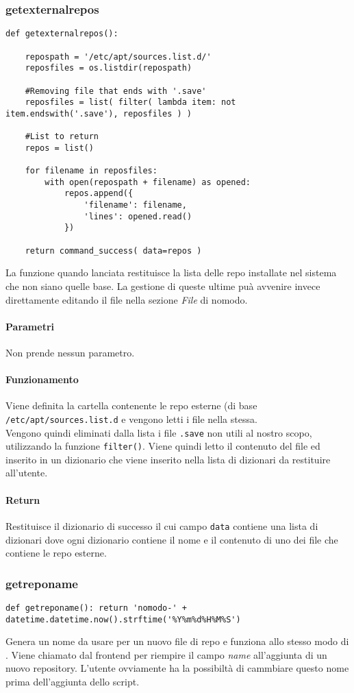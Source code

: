 \documentclass[11pt]{article}
\begin{document}
\subsubsection{getexternalrepos}\label{getexternalrepos}
\begin{lstlisting}
def getexternalrepos():

    repospath = '/etc/apt/sources.list.d/'
    reposfiles = os.listdir(repospath)

    #Removing file that ends with '.save'
    reposfiles = list( filter( lambda item: not item.endswith('.save'), reposfiles ) )

    #List to return
    repos = list()

    for filename in reposfiles:
        with open(repospath + filename) as opened:
            repos.append({
                'filename': filename,
                'lines': opened.read()
            })

    return command_success( data=repos )
\end{lstlisting}
La funzione quando lanciata restituisce la lista delle repo installate nel sistema che non siano quelle base. La gestione
di queste ultime puà avvenire invece direttamente editando il file nella sezione \textit{File} di nomodo.
\paragraph{Parametri}
Non prende nessun parametro.
\paragraph{Funzionamento}
Viene definita la cartella contenente le repo esterne (di base \texttt{/etc/apt/sources.list.d} e vengono letti i file
nella stessa.\\
Vengono quindi eliminati dalla lista i file \texttt{.save} non utili al nostro scopo, utilizzando la funzione \texttt{filter()}.
Viene quindi letto il contenuto del file ed inserito in un dizionario che viene inserito nella lista di dizionari da restituire
all'utente.
\paragraph{Return}
Restituisce il dizionario di successo il cui campo \texttt{data} contiene una lista di dizionari dove ogni dizionario contiene
il nome e il contenuto di uno dei file che contiene le repo esterne.

\subsubsection{getreponame}\label{getreponame}
\begin{lstlisting}
def getreponame(): return 'nomodo-' + datetime.datetime.now().strftime('%Y%m%d%H%M%S')
\end{lstlisting}
Genera un nome da usare per un nuovo file di repo e funziona allo stesso modo di .
Viene chiamato dal frontend per riempire il campo \textit{name} all'aggiunta di un nuovo repository.
L'utente ovviamente ha la possibiltà di cammbiare questo nome prima dell'aggiunta dello script.
\end{document}
